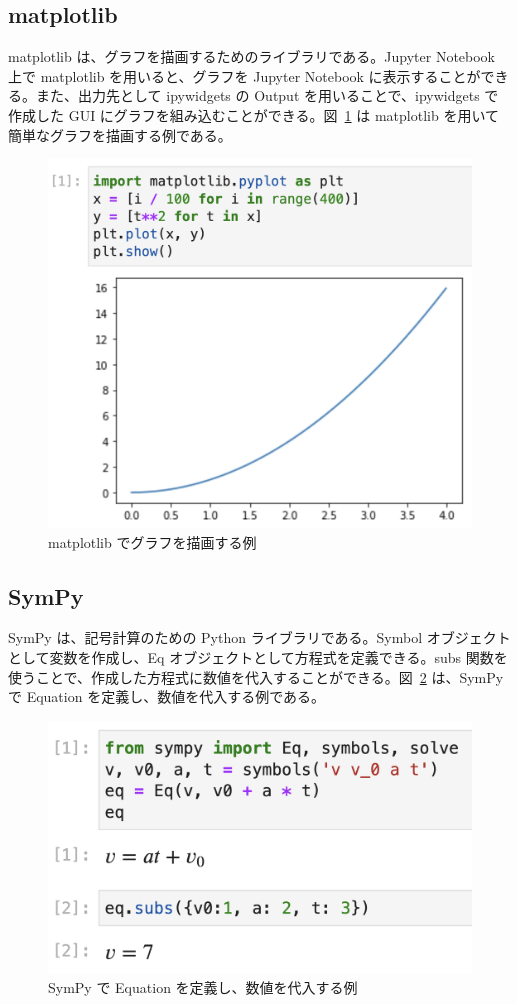 \subsection{matplotlib}
matplotlib は、グラフを描画するためのライブラリである。Jupyter Notebook 上で matplotlib を用いると、グラフを Jupyter Notebook に表示することができる。また、出力先として ipywidgets の Output を用いることで、ipywidgets で作成した GUI にグラフを組み込むことができる。図~\ref{example_matplotlib} は matplotlib を用いて簡単なグラフを描画する例である。

\begin{figure}[htb]
\centering
\includegraphics[width=0.9\linewidth]{work/example_matplotlib.png}
\caption{matplotlib でグラフを描画する例} \label{example_matplotlib}
\end{figure}

\subsection{SymPy}
SymPy は、記号計算のための Python ライブラリである。Symbol オブジェクトとして変数を作成し、Eq オブジェクトとして方程式を定義できる。subs 関数を使うことで、作成した方程式に数値を代入することができる。図~\ref{example_sympy} は、SymPy で Equation を定義し、数値を代入する例である。

\begin{figure}[bht]
\centering
\includegraphics[width=0.9\linewidth]{work/example_sympy.png}
\caption{SymPy で Equation を定義し、数値を代入する例} \label{example_sympy}
\end{figure}

